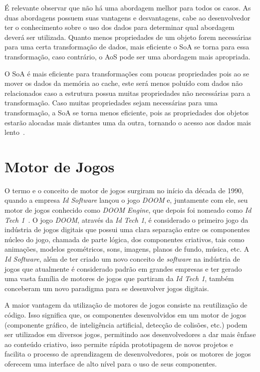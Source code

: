 É relevante observar que não há uma abordagem melhor para todos os 
casos. As duas abordagens possuem suas vantagens e desvantagens, 
cabe ao desenvolvedor ter o conhecimento sobre o uso dos dados 
para determinar qual abordagem deverá ser utilizada. Quanto menos 
propriedades de um objeto forem necessárias para uma certa 
transformação de dados, mais eficiente o SoA se torna para essa 
transformação, caso contrário, o AoS pode ser uma abordagem mais 
apropriada.

O SoA é mais eficiente para transformações com poucas propriedades 
pois ao se mover os dados da memória ao cache, este será menos 
poluído com dados não relacionados caso a estrutura possua 
muitas propriedades não necessárias para a transformação. 
Caso muitas propriedades sejam necessárias para uma transformação, 
a SoA se torna menos eficiente, pois as propriedades dos objetos 
estarão alocadas mais distantes uma da outra, tornando o acesso 
aos dados mais lento~\cite{Fontana2017}.

\section{Motor de Jogos}
\label{secgameengine}

O termo e o conceito de motor de jogos surgiram no início da década de 1990, quando a 
empresa \textit{Id Software} lançou o jogo \textit{DOOM} e, juntamente com ele, seu 
motor de jogos conhecido como \textit{DOOM Engine}, que depois foi nomeado como 
\textit{Id Tech 1}~\cite{gregory2009game}.
O jogo \textit{DOOM}, através da \textit{Id Tech 1}, é considerado o primeiro jogo da 
indústria de jogos digitais que possui uma clara separação entre os componentes núcleo 
do jogo, chamada de parte lógica, dos componentes criativos, tais como animações, 
modelos geométricos, sons, imagens, planos de fundo, música, etc.
A \textit{Id Software}, além de ter criado um novo conceito de \textit{software} 
na indústria de jogos que atualmente é considerado padrão em grandes empresas e ter 
gerado uma vasta família de motores de jogos que partiram da \textit{Id Tech 1}, também 
conceberam um novo paradigma para se desenvolver jogos digitais.

A maior vantagem da utilização de motores de jogos consiste na reutilização de código. 
Isso significa que, os componentes desenvolvidos em um motor de jogos (componente gráfico, 
de inteligência artificial, detecção de colisões, etc.) podem ser utilizados em diversos 
jogos, permitindo aos desenvolvedores a dar mais ênfase ao conteúdo criativo,
isso permite rápida prototipagem de novos projetos e facilita o processo de aprendizagem 
de desenvolvedores, pois os motores de jogos oferecem uma interface de alto nível para 
o uso de seus componentes.

